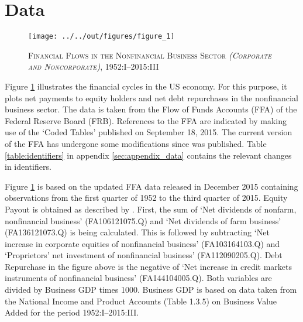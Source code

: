 \section{Data}
\label{sec:data}

\begin{figure}[t]
    
    \centering

    \texttt{[image: ../../out/figures/figure\_1]}

    \caption{\textsc{Financial Flows in the Nonfinancial Business Sector \textit{(Corporate and Noncorporate)}}, 1952:I--2015:III}
    
    \label{fig:figure_1}

\end{figure}


Figure \ref{fig:figure_1} illustrates the financial cycles in the US economy. For this purpose, it plots net payments to equity holders and net debt repurchases in the nonfinancial business sector. The data is taken from the Flow of Funds Accounts (FFA) of the Federal Reserve Board (FRB).
References to the FFA are indicated by making use of the ‘Coded Tables’ published on September 18, 2015. The current version of the FFA has undergone some modifications since \citet{JERMANNfinancial} was published. 
Table \ref{table:identifiers} in appendix \ref{sec:appendix_data} contains the relevant changes in identifiers.

Figure \ref{fig:figure_1} is based on the updated FFA data released in December 2015 containing observations from the first quarter of 1952 to the third quarter of 2015. Equity Payout is obtained as described by \citeauthor{JERMANNfinancial}. First, the sum of ‘Net dividends of nonfarm, nonfinancial business’ (FA106121075.Q) and ‘Net dividends of farm business’ (FA136121073.Q) is being calculated. This is followed by subtracting ‘Net increase in corporate equities of nonfinancial business’ (FA103164103.Q) and ‘Proprietors’ net investment of nonfinancial business’ (FA112090205.Q). Debt Repurchase in the figure above is the negative of ‘Net increase in credit markets instruments of nonfinancial business’ (FA144104005.Q). 
Both variables are divided by Business GDP times 1000. Business GDP is based on data taken from the National Income and Product Accounts (Table 1.3.5) on Business Value Added for the period 1952:I--2015:III.

